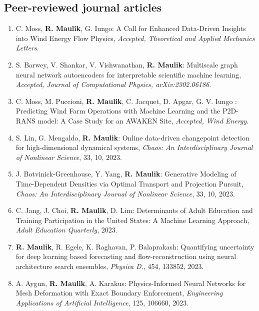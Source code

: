 \documentclass[letterpaper]{article}
\begin{document}
\subsection*{Peer-reviewed journal articles}

\begin{enumerate}

\item C. Moss, \textbf{R. Maulik}, G. Iungo: A Call for Enhanced Data-Driven Insights into Wind Energy Flow Physics, {\it Accepted, Theoretical and Applied Mechanics Letters}.

\item S. Barwey, V. Shankar, V. Vishwanathan, \textbf{R. Maulik}: Multiscale graph neural network autoencoders for interpretable scientific machine learning, {\it Accepted, Journal of Computational Physics, arXiv:2302.06186}.

\item C. Moss, M. Puccioni, \textbf{R. Maulik}, C. Jacquet, D. Apgar, G. V. Iungo : Predicting Wind Farm Operations with Machine Learning and the P2D-RANS model: A Case Study for an AWAKEN Site, {\it Accepted, Wind Energy}.

\item S. Lin, G. Mengaldo, \textbf{R. Maulik}: Online data-driven changepoint detection for high-dimensional dynamical systems, {\it Chaos: An Interdisciplinary Journal of Nonlinear Science}, 33, 10, 2023.

\item J. Botvinick-Greenhouse, Y. Yang, \textbf{R. Maulik}: Generative Modeling of Time-Dependent Densities via Optimal Transport and Projection Pursuit, {\it Chaos: An Interdisciplinary Journal of Nonlinear Science}, 33, 10, 2023.

\item C. Jang, J. Choi, \textbf{R. Maulik}, D. Lim: Determinants of Adult Education and Training Participation in the United States: A Machine Learning Approach, {\it Adult Education Quarterly}, 2023.

\item \textbf{R. Maulik}, R. Egele, K. Raghavan, P. Balaprakash: Quantifying uncertainty for deep learning based forecasting and flow-reconstruction using neural architecture search ensembles, {\it Physica D.}, 454, 133852, 2023.

\item A. Aygun, \textbf{R. Maulik}, A. Karakus: Physics-Informed Neural Networks for Mesh Deformation with Exact Boundary Enforcement, {\it Engineering Applications of Artificial Intelligence}, 125, 106660, 2023.


\end{enumerate}
\end{document}
